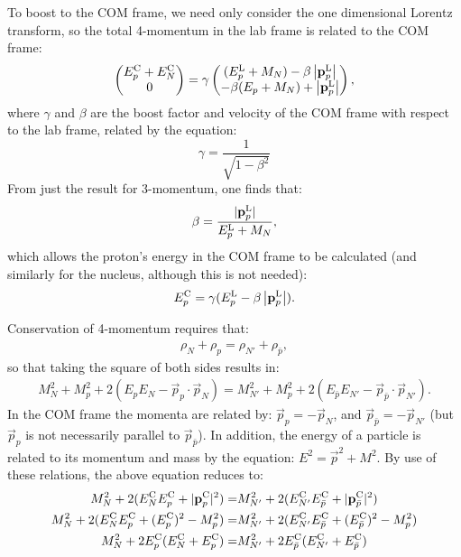 To boost to the \ac{COM} frame, we need only consider the one dimensional Lorentz transform, so the total 4-momentum in the lab frame is related to the \ac{COM} frame:
\begin{align}
\begin{pmatrix}
E_p^\com+E_N^\com\\
0
\end{pmatrix}
=\gamma
\begin{pmatrix}
(E^\lab_p+M_N)-\beta\left|\vec{p}^\lab_p\right|\\
-\beta(E_p+M_N)+\left|\vec{p}^\lab_p\right|
\end{pmatrix},
\eqlabel{app:antip:labToCom}
\end{align}
where $\gamma$ and $\beta$ are the boost factor and velocity of the \ac{COM} frame with respect to the lab frame, related by the equation:
\begin{equation}
\gamma=\frac{1}{\sqrt{1-\beta^2}}
\end{equation}
From just the result for 3-momentum, one finds that:
\begin{align}
\beta=\frac{|\mathbf{p}^{\textrm{L}}_p|}{E_p^{\textrm{L}}+M_N},
\end{align}
which allows the proton's energy in the COM frame to be calculated (and similarly for the nucleus, although this is not needed):
\begin{align}
E_p^{\textrm{C}}
=\gamma(
E^{\textrm{L}}_p-\beta\left|\mathbf{p}^{\textrm{L}}_p\right|
).
\end{align}

Conservation of 4-momentum requires that:
\begin{align}
\rho_N+\rho_p =\rho_{N'}+ \rho_{\bar{p}},
\end{align}
so that taking the square of both sides results in:
\begin{align}
M_N^2+M_p^2+2(E_pE_N- \vec{p}_p\cdot\vec{p}_N)= M^2_{N'}+M^2_p+2(E_{\bar{p}}E_{N'}-\vec{p}_{\bar{p}}\cdot\vec{p}_{N'}).
\end{align}
In the \ac{COM} frame the momenta are related by: $\vec{p}_p=-\vec{p}_{N}$, and $\vec{p}_{\bar{p}}=-\vec{p}_{N'}$ (but $\vec{p}_p$ is not necessarily parallel to $\vec{p}_{\bar{p}}$).
In addition, the energy of a particle is related to its momentum and mass by the equation: $E^2=\vec{p}^2+M^2$.
By use of these relations, the above equation reduces to:
\begin{align}
M_N^2+2(E^{\textrm{C}}_NE^{\textrm{C}}_p+|\mathbf{p}_p^{\textrm{C}}|^2)
=&
M_{N'}^2+2(E^{\textrm{C}}_{N'}E^{\textrm{C}}_{\bar{p}}+|\mathbf{p}_{\bar{p}}^{\textrm{C}}|^2)\\
M_N^2+2(E^{\textrm{C}}_NE^{\textrm{C}}_p+(E^{\textrm{C}}_p)^2-M^2_p)
=&
M_{N'}^2+2(E^{\textrm{C}}_{N'}E^{\textrm{C}}_{\bar{p}}+(E^{\textrm{C}}_{\bar{p}})^2-M^2_{p})\\
M_N^2+2E^{\textrm{C}}_p(E^{\textrm{C}}_N+E^{\textrm{C}}_p)
=&
M_{N'}^2+2E^{\textrm{C}}_{\bar{p}}(E^{\textrm{C}}_{N'}+E^{\textrm{C}}_{\bar{p}})
\end{align}

